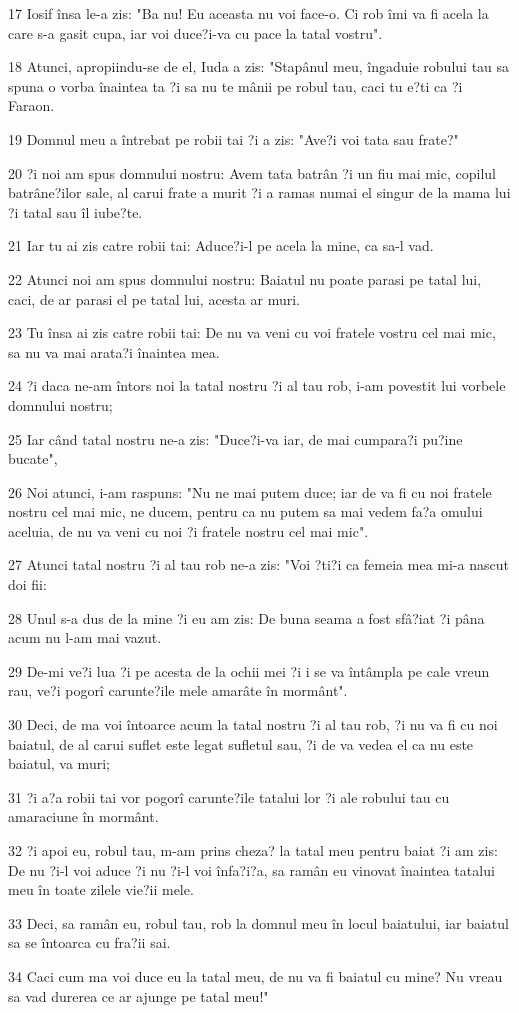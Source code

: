 \par 17 Iosif însa le-a zis: "Ba nu! Eu aceasta nu voi face-o. Ci rob îmi va fi acela la care s-a gasit cupa, iar voi duce?i-va cu pace la tatal vostru".
\par 18 Atunci, apropiindu-se de el, Iuda a zis: "Stapânul meu, îngaduie robului tau sa spuna o vorba înaintea ta ?i sa nu te mânii pe robul tau, caci tu e?ti ca ?i Faraon.
\par 19 Domnul meu a întrebat pe robii tai ?i a zis: "Ave?i voi tata sau frate?"
\par 20 ?i noi am spus domnului nostru: Avem tata batrân ?i un fiu mai mic, copilul batrâne?ilor sale, al carui frate a murit ?i a ramas numai el singur de la mama lui ?i tatal sau îl iube?te.
\par 21 Iar tu ai zis catre robii tai: Aduce?i-l pe acela la mine, ca sa-l vad.
\par 22 Atunci noi am spus domnului nostru: Baiatul nu poate parasi pe tatal lui, caci, de ar parasi el pe tatal lui, acesta ar muri.
\par 23 Tu însa ai zis catre robii tai: De nu va veni cu voi fratele vostru cel mai mic, sa nu va mai arata?i înaintea mea.
\par 24 ?i daca ne-am întors noi la tatal nostru ?i al tau rob, i-am povestit lui vorbele domnului nostru;
\par 25 Iar când tatal nostru ne-a zis: "Duce?i-va iar, de mai cumpara?i pu?ine bucate",
\par 26 Noi atunci, i-am raspuns: "Nu ne mai putem duce; iar de va fi cu noi fratele nostru cel mai mic, ne ducem, pentru ca nu putem sa mai vedem fa?a omului aceluia, de nu va veni cu noi ?i fratele nostru cel mai mic".
\par 27 Atunci tatal nostru ?i al tau rob ne-a zis: "Voi ?ti?i ca femeia mea mi-a nascut doi fii:
\par 28 Unul s-a dus de la mine ?i eu am zis: De buna seama a fost sfâ?iat ?i pâna acum nu l-am mai vazut.
\par 29 De-mi ve?i lua ?i pe acesta de la ochii mei ?i i se va întâmpla pe cale vreun rau, ve?i pogorî carunte?ile mele amarâte în mormânt".
\par 30 Deci, de ma voi întoarce acum la tatal nostru ?i al tau rob, ?i nu va fi cu noi baiatul, de al carui suflet este legat sufletul sau, ?i de va vedea el ca nu este baiatul, va muri;
\par 31 ?i a?a robii tai vor pogorî carunte?ile tatalui lor ?i ale robului tau cu amaraciune în mormânt.
\par 32 ?i apoi eu, robul tau, m-am prins cheza? la tatal meu pentru baiat ?i am zis: De nu ?i-l voi aduce ?i nu ?i-l voi înfa?i?a, sa ramân eu vinovat înaintea tatalui meu în toate zilele vie?ii mele.
\par 33 Deci, sa ramân eu, robul tau, rob la domnul meu în locul baiatului, iar baiatul sa se întoarca cu fra?ii sai.
\par 34 Caci cum ma voi duce eu la tatal meu, de nu va fi baiatul cu mine? Nu vreau sa vad durerea ce ar ajunge pe tatal meu!"

